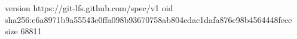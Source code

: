 version https://git-lfs.github.com/spec/v1
oid sha256:e6a8971b9a55543e0ffa098b93670758ab804edac1dafa876c98b4564448feee
size 68811
